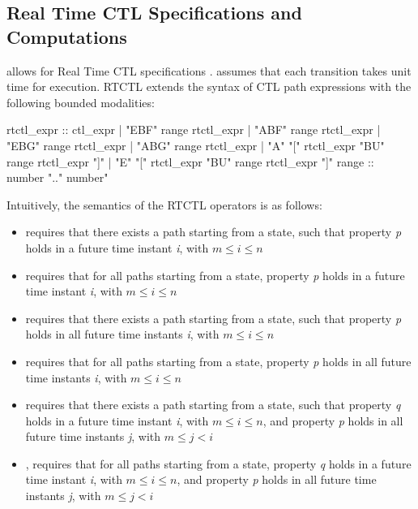\subsection{Real Time CTL Specifications and Computations}
\label{Real Time CTL Specifications and Computations}
\nusmv allows for Real Time CTL specifications
%
\cite{EMSS91}. \nusmv assumes that each transition takes unit time for
execution. RTCTL extends the syntax of CTL path expressions with the
following bounded modalities:
%
\begin{Grammar}
rtctl_expr ::
        ctl_expr
      | "EBF" range rtctl_expr
      | "ABF" range rtctl_expr
      | "EBG" range rtctl_expr
      | "ABG" range rtctl_expr
      | "A" "[" rtctl_expr "BU" range rtctl_expr "]"
      | "E" "[" rtctl_expr "BU" range rtctl_expr "]"
range  :: number ".." number"
\end{Grammar}
%
Intuitively, the semantics of the RTCTL operators is as follows:
%
\begin{itemize}
  \item {}
        requires that there exists a path starting from a state, such
        that property \textit{p} holds in a future time instant
        \textit{i}, with $m \leq i \leq n$
  \item {}
        requires that for all paths starting from a state, property
        \textit{p} holds in a future time instant \textit{i}, with $m
        \leq i \leq n$
  \item {}
        requires that there exists a path starting from a state, such
        that property \textit{p} holds in all future time instants
        \textit{i}, with $m \leq i \leq n$
  \item {}
        requires that for all paths starting from a state, property
        \textit{p} holds in all future time instants \textit{i}, with
        $m \leq i \leq n$
  \item {}
        requires that there exists a path starting from a state, such
        that property \textit{q} holds in a future time instant
        \textit{i}, with $m \leq i \leq n$, and property \textit{p}
        holds in all future time instants \textit{j}, with $m \leq j <
        i$
  \item {},
        requires that for all paths starting from a state, property
        \textit{q} holds in a future time instant \textit{i}, with $m
        \leq i \leq n$, and property \textit{p} holds in all future
        time instants \textit{j}, with $m \leq j < i$
\end{itemize}
